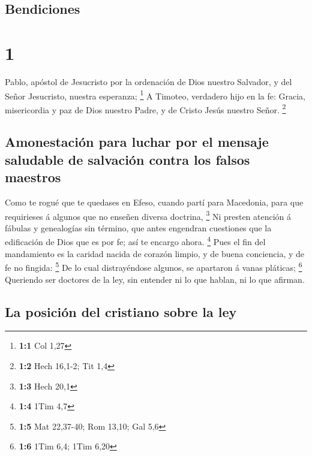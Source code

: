 \hypertarget{bendiciones}{%
\subsection{Bendiciones}\label{bendiciones}}

\hypertarget{section}{%
\section{1}\label{section}}

 Pablo, apóstol de Jesucristo por la ordenación de Dios
nuestro Salvador, y del Señor Jesucristo, nuestra esperanza; \footnote{\textbf{1:1}
  Col 1,27}  A Timoteo, verdadero hijo en la fe: Gracia,
misericordia y paz de Dios nuestro Padre, y de Cristo Jesús nuestro
Señor. \footnote{\textbf{1:2} Hech 16,1-2; Tit 1,4}

\hypertarget{amonestaciuxf3n-para-luchar-por-el-mensaje-saludable-de-salvaciuxf3n-contra-los-falsos-maestros}{%
\subsection{Amonestación para luchar por el mensaje saludable de
salvación contra los falsos
maestros}\label{amonestaciuxf3n-para-luchar-por-el-mensaje-saludable-de-salvaciuxf3n-contra-los-falsos-maestros}}

 Como te rogué que te quedases en Efeso, cuando partí para
Macedonia, para que requirieses á algunos que no enseñen diversa
doctrina, \footnote{\textbf{1:3} Hech 20,1}  Ni presten
atención á fábulas y genealogías sin término, que antes engendran
cuestiones que la edificación de Dios que es por fe; así te encargo
ahora. \footnote{\textbf{1:4} 1Tim 4,7}  Pues el fin del
mandamiento es la caridad nacida de corazón limpio, y de buena
conciencia, y de fe no fingida: \footnote{\textbf{1:5} Mat 22,37-40; Rom
  13,10; Gal 5,6}  De lo cual distrayéndose algunos, se
apartaron á vanas pláticas; \footnote{\textbf{1:6} 1Tim 6,4; 1Tim 6,20}
 Queriendo ser doctores de la ley, sin entender ni lo que
hablan, ni lo que afirman.

\hypertarget{la-posiciuxf3n-del-cristiano-sobre-la-ley}{%
\subsection{La posición del cristiano sobre la
ley}\label{la-posiciuxf3n-del-cristiano-sobre-la-ley}}

